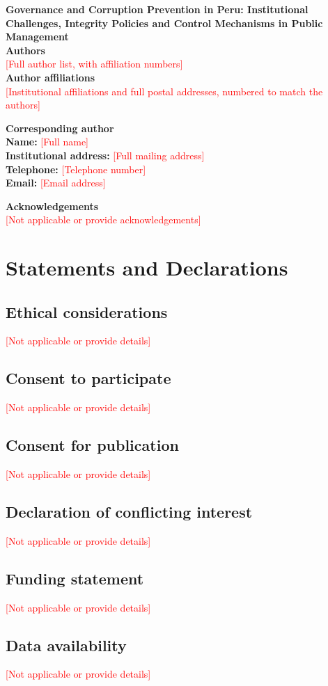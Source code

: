 \documentclass[12pt,a4paper]{article}
\newcommand{\relleno}[1]{\textcolor{red}{[#1]}}
\begin{document}
\begin{center}
{\Large\bfseries Governance and Corruption Prevention in Peru: Institutional Challenges, Integrity Policies and Control Mechanisms in Public Management}\\[1.5em]
\textbf{Authors}\\
\relleno{Full author list, with affiliation numbers}\\[0.75em]
\textbf{Author affiliations}\\
\relleno{Institutional affiliations and full postal addresses, numbered to match the authors}
\end{center}

\vspace{1.5em}
\noindent\textbf{Corresponding author}\\
\textbf{Name:} \relleno{Full name}\\
\textbf{Institutional address:} \relleno{Full mailing address}\\
\textbf{Telephone:} \relleno{Telephone number}\\
\textbf{Email:} \relleno{Email address}

\vspace{1em}
\noindent\textbf{Acknowledgements}\\
\relleno{Not applicable or provide acknowledgements}

\section*{Statements and Declarations}
\subsection*{Ethical considerations}
\relleno{Not applicable or provide details}

\subsection*{Consent to participate}
\relleno{Not applicable or provide details}

\subsection*{Consent for publication}
\relleno{Not applicable or provide details}

\subsection*{Declaration of conflicting interest}
\relleno{Not applicable or provide details}

\subsection*{Funding statement}
\relleno{Not applicable or provide details}

\subsection*{Data availability}
\relleno{Not applicable or provide details}
\end{document}
